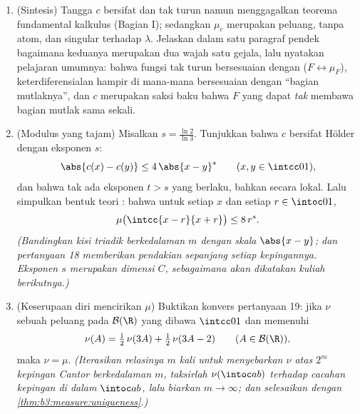 \begin{problem}
\begin{enumerate}[resume]
        --- yakni himpunan tertutup terkecil yang berukuran penuh --- tepat
        berupa $C$.
  \item (Sintesis) Tangga $c$ bersifat  dan
        tak turun namun menggagalkan teorema fundamental
        kalkulus (Bagian I); sedangkan  $\mu_c$ merupakan
        peluang, tanpa atom, dan singular terhadap
        $\lambda$. Jelaskan dalam satu paragraf pendek bagaimana keduanya
        merupakan dua wajah satu gejala, lalu nyatakan
        pelajaran umumnya: bahwa fungsi tak turun bersesuaian dengan 
        ($F \leftrightarrow \mu_F$), keterdiferensialan hampir di mana-mana
        bersesuaian dengan ``bagian  mutlaknya'', dan
        $c$ merupakan saksi baku bahwa $F$ yang  dapat
        \emph{tak} membawa bagian  mutlak sama sekali.
  \item (Modulus  yang tajam) Misalkan $s =
        \frac{\ln 2}{\ln 3}$. Tunjukkan bahwa $c$ bersifat Hölder
         dengan eksponen $s$:
        \[
        \abs{c(x) - c(y)} \leq 4\,\abs{x - y}^{s}
        \qquad (x, y \in \intcc01),
        \]
        dan bahwa tak ada eksponen $t > s$ yang berlaku, bahkan secara lokal.
        Lalu simpulkan bentuk teori : bahwa untuk setiap $x$ dan
        setiap $r \in \intoc01$,
        \[
        \mu\bigl(\intcc{x - r}{x + r}\bigr) \leq 8\,r^{s} .
        \]
        \emph{(Bandingkan kisi triadik berkedalaman $m$ dengan skala
        $\abs{x - y}$; dan pertanyaan 18 memberikan pendakian sepanjang
        setiap kepingannya. Eksponen $s$ merupakan dimensi 
        $C$, sebagaimana akan dikatakan kuliah berikutnya.)}
  \item (Keserupaan diri mencirikan $\mu$) Buktikan
        konvers pertanyaan 19: jika $\nu$ sebuah  peluang
        pada $\mathcal B(\R)$ yang dibawa $\intcc01$ dan
        memenuhi
        \[
        \nu(A) = \tfrac12\,\nu(3A) + \tfrac12\,\nu(3A - 2)
        \qquad (A \in \mathcal B(\R)),
        \]
        maka $\nu = \mu$. \emph{(Iterasikan relasinya $m$
        kali untuk menyebarkan $\nu$ atas $2^m$ kepingan Cantor
        berkedalaman $m$, taksirlah $\nu(\intoc ab)$ terhadap cacahan
        kepingan di dalam $\intoc ab$, lalu biarkan $m \to \infty$;
        dan selesaikan dengan \cref{thm:b3:measure:uniqueness}.)}

\end{enumerate}
\end{problem}
